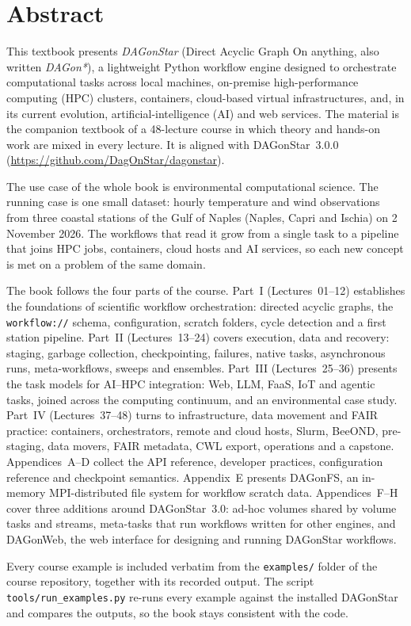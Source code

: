 \chapter*{Abstract}

This textbook presents \emph{DAGonStar} (Direct Acyclic Graph On anything, also
written \emph{DAGon*}), a lightweight Python workflow engine designed to
orchestrate computational tasks across local machines, on-premise
high-performance computing (HPC) clusters, containers, cloud-based virtual
infrastructures, and, in its current evolution, artificial-intelligence (AI)
and web services. The material is the companion textbook of a 48-lecture course in which
theory and hands-on work are mixed in every lecture. It is aligned with
DAGonStar~3.0.0 (\url{https://github.com/DagOnStar/dagonstar}).

The use case of the whole book is environmental computational science. The
running case is one small dataset: hourly temperature and wind
observations from three coastal stations of the Gulf of Naples (Naples, Capri
and Ischia) on 2 November 2026. The workflows that read it grow from a single
task to a pipeline that joins HPC jobs, containers, cloud hosts and AI
services, so each new concept is met on a problem of the same domain.

The book follows the four parts of the course. Part~I (Lectures~01--12)
establishes the foundations of scientific workflow orchestration: directed
acyclic graphs, the \texttt{workflow://} schema, configuration, scratch
folders, cycle detection and a first station pipeline. Part~II
(Lectures~13--24) covers execution, data and recovery: staging, garbage
collection, checkpointing, failures, native tasks, asynchronous runs,
meta-workflows, sweeps and ensembles. Part~III (Lectures~25--36) presents the
task models for AI--HPC integration: Web, LLM, FaaS, IoT and agentic tasks,
joined across the computing continuum, and an environmental case study.
Part~IV (Lectures~37--48) turns to infrastructure, data movement and FAIR
practice: containers, orchestrators, remote and cloud hosts, Slurm, BeeOND,
pre-staging, data movers, FAIR metadata, CWL export, operations and a
capstone. Appendices~A--D collect the API reference, developer practices,
configuration reference and checkpoint semantics. Appendix~E presents
DAGonFS, an in-memory MPI-distributed file system for workflow scratch data.
Appendices~F--H cover three additions around DAGonStar~3.0: ad-hoc volumes
shared by volume tasks and streams, meta-tasks that run workflows written for
other engines, and DAGonWeb, the web interface for designing and running
DAGonStar workflows.

Every course example is included verbatim from the \texttt{examples/}
folder of the course repository, together with its recorded output. The
script \texttt{tools/run\_examples.py} re-runs every example against the
installed DAGonStar and compares the outputs, so the book stays consistent
with the code.
